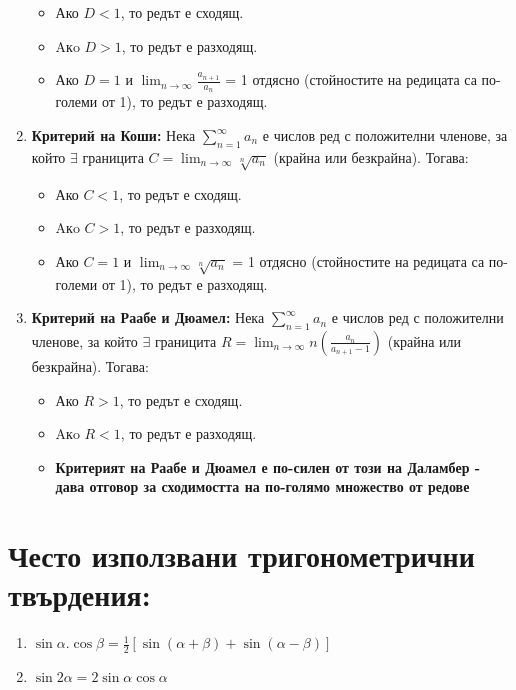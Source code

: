 \documentclass[11pt,oneside,a4paper]{article}
\begin{document}
\begin{enumerate}
    \begin{itemize}
        \item Ако \(D < 1\), то редът е сходящ.
        \item Aкo \(D > 1\), то редът е разходящ.
        \item Ако \(D = 1\) и \(\displaystyle \lim_{n \to \infty} \frac{a_{n+1}}{a_n}\) = 1 отдясно (стойностите на редицата са по-големи от 1), то редът е разходящ.
    \end{itemize}
    \item \textbf{Критерий на Коши: } Нека \(\displaystyle \sum_{n=1}^{\infty} a_n\) е числов ред с положителни членове, за който \(\exists\) границита \(C = \displaystyle \lim_{n \to \infty} \sqrt[n]{a_n}\) (крайна или безкрайна). Тогава: 
    \begin{itemize}
        \item Ако \(C < 1\), то редът е сходящ.
        \item Aкo \(C > 1\), то редът е разходящ.
        \item Ако \(C = 1\) и \(\displaystyle \lim_{n \to \infty} \sqrt[n]{a_n}\) = 1 отдясно (стойностите на редицата са по-големи от 1), то редът е разходящ.
    \end{itemize}
    \item \textbf{Критерий на Раабе и Дюамел: } Нека \(\displaystyle \sum_{n=1}^{\infty} a_n\) е числов ред с положителни членове, за който \(\exists\) границита \(R = \displaystyle \lim_{n \to \infty} n(\frac{a_n}{a_{n+1}-1})\) (крайна или безкрайна). Тогава: 
    \begin{itemize}
        \item Ако \(R > 1\), то редът е сходящ.
        \item Aкo \(R < 1\), то редът е разходящ.
        \item \textbf{Критерият на Раабе и Дюамел е по-силен от този на Даламбер - дава отговор за сходимостта на по-голямо множество от редове}
    \end{itemize}
\end{enumerate}

\section*{Често използвани тригонометрични твърдения: }

\begin{enumerate}
    \item \(\sin{\alpha}.\cos{\beta} = \frac{1}{2}[\sin (\alpha + \beta) + \sin (\alpha - \beta)]\)
    \item \(\sin{2\alpha} = 2  \sin {\alpha} \cos {\alpha} \)
\end{enumerate}
\end{document}
